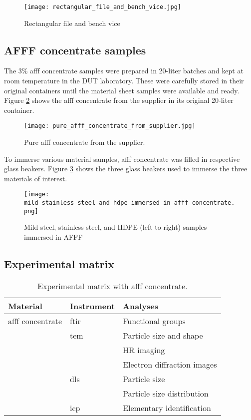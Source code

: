 \begin{figure}[H]
    \centering
    \texttt{[image: rectangular\_file\_and\_bench\_vice.jpg]}
    \caption{Rectangular file and bench vice}
    \label{ch4:figure:file_and_vice}
\end{figure}

\subsection{AFFF concentrate samples}
The 3\% \acrshort{afff} concentrate samples were prepared in 20-liter batches and kept at room temperature in the DUT laboratory. These were carefully stored in their original containers until the material sheet samples were available and ready. Figure \ref{ch4:figure:suplier} shows the \acrshort{afff} concentrate from the supplier in its original 20-liter container.
 
\begin{figure}[H]
    \centering
    \texttt{[image: pure\_afff\_concentrate\_from\_supplier.jpg]}
    \caption{Pure \acrshort{afff} concentrate from the supplier.}
    \label{ch4:figure:suplier}
\end{figure}

To immerse various material samples, \acrshort{afff} concentrate was filled in respective glass beakers. Figure \ref{ch4:figure:immersed} shows the three glass beakers used to immerse the three materials of interest.
 
\begin{figure}[H]
\texttt{[image: mild\_stainless\_steel\_and\_hdpe\_immersed\_in\_afff\_concentrate.png]}
\caption{Mild steel, stainless steel, and HDPE (left to right) samples immersed in AFFF}
\label{ch4:figure:immersed}
\end{figure}

\subsection{Experimental matrix}

\begin{table}[H]
\centering
\caption{Experimental matrix with \acrshort{afff} concentrate.}

\renewcommand{\arraystretch}{2.5}
\begin{tabularx}{\textwidth}{ XXX }
    \hline
    Material & Instrument & Analyses \\
    \hline
    \acrshort{afff} concentrate & \acrshort{ftir} & Functional groups \\
    & \acrshort{tem} & Particle size and shape \\
    & & HR imaging \\
    & & Electron diffraction images \\
    & \acrshort{dls} & Particle size \\
    & & Particle size distribution \\
    & \acrshort{icp} & Elementary identification \\
    \hline
\end{tabularx}

\end{table}

